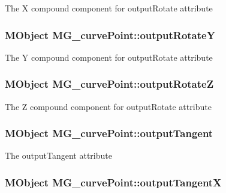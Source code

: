 The X compound component for output\-Rotate attribute \hypertarget{class_m_g__curve_point_a9ecdff080fe7327f09900185d1adff2b}{
\subsubsection[{output\-Rotate\-Y}]{\setlength{\rightskip}{0pt plus 5cm}M\-Object M\-G\-\_\-curve\-Point\-::output\-Rotate\-Y\hspace{0.3cm}{\ttfamily [static]}}}\label{class_m_g__curve_point_a9ecdff080fe7327f09900185d1adff2b}
The Y compound component for output\-Rotate attribute \hypertarget{class_m_g__curve_point_ac7bb1789786719174d617d85f3f78796}{
\subsubsection[{output\-Rotate\-Z}]{\setlength{\rightskip}{0pt plus 5cm}M\-Object M\-G\-\_\-curve\-Point\-::output\-Rotate\-Z\hspace{0.3cm}{\ttfamily [static]}}}\label{class_m_g__curve_point_ac7bb1789786719174d617d85f3f78796}
The Z compound component for output\-Rotate attribute \hypertarget{class_m_g__curve_point_a1025b953df44e00d1d276ea29e7eab23}{
\subsubsection[{output\-Tangent}]{\setlength{\rightskip}{0pt plus 5cm}M\-Object M\-G\-\_\-curve\-Point\-::output\-Tangent\hspace{0.3cm}{\ttfamily [static]}}}\label{class_m_g__curve_point_a1025b953df44e00d1d276ea29e7eab23}
The output\-Tangent attribute \hypertarget{class_m_g__curve_point_ad9c8e30200127bfb68e48752058d7620}{
\subsubsection[{output\-Tangent\-X}]{\setlength{\rightskip}{0pt plus 5cm}M\-Object M\-G\-\_\-curve\-Point\-::output\-Tangent\-X\hspace{0.3cm}{\ttfamily [static]}}}\label{class_m_g__curve_point_ad9c8e30200127bfb68e48752058d7620}
